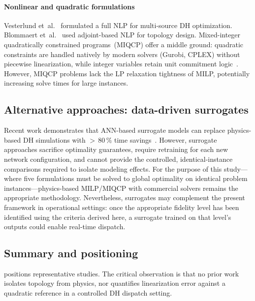 \documentclass[review,3p]{elsarticle}
\begin{document}
\paragraph{Nonlinear and quadratic formulations}
Vesterlund et~al.~\cite{Vesterlund2017} formulated a full NLP for
multi-source DH optimization. Blommaert et~al.~\cite{Blommaert2020}
used adjoint-based NLP for topology design. Mixed-integer
quadratically constrained programs~(MIQCP) offer a middle ground:
quadratic constraints are handled natively by modern solvers (Gurobi,
CPLEX) without piecewise linearization, while integer variables retain
unit commitment logic~\cite{Ommen2016}. However, MIQCP problems lack
the LP relaxation tightness of MILP, potentially increasing solve
times for large instances.

\subsection{Alternative approaches: data-driven surrogates}
\label{sec:rw_surrogates}

Recent work demonstrates that ANN-based surrogate models can replace
physics-based DH simulations with ${>}\,80\,\%$ time
savings~\cite{Guo2025}. However, surrogate approaches sacrifice
optimality guarantees, require retraining for each new network
configuration, and cannot provide the controlled, identical-instance
comparisons required to isolate modeling effects. For the purpose of
this study---where five formulations must be solved to global
optimality on identical problem instances---physics-based MILP/MIQCP
with commercial solvers remains the appropriate methodology.
Nevertheless, surrogates may complement the present framework in
operational settings: once the appropriate fidelity level has been
identified using the criteria derived here, a surrogate trained on
that level's outputs could enable real-time dispatch.

\subsection{Summary and positioning}
\label{sec:rw_summary}

 positions representative studies. The critical
observation is that no prior work isolates topology from physics, nor
quantifies linearization error against a quadratic reference in a
controlled DH dispatch setting.
\end{document}
